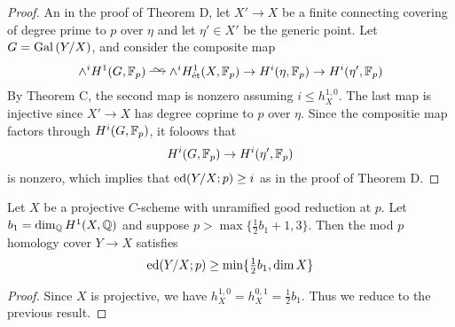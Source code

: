 \documentclass[12pt]{article}
\begin{document}
\begin{proof}
An in the proof of Theorem D, let $X' \to X$ be a finite connecting covering of degree prime to $p$ over $\eta$ and let $\eta' \in X'$ be the generic point. Let $G = \mathrm{Gal}\left( Y/X \right)$, and consider the composite map
\[ \wedge^i H^1(G, \FF_p) \iso \wedge^i H^1_{\et}(X, \FF_p) \to H^i(\eta, \FF_p) \to H^i(\eta', \FF_p) \]
By Theorem C, the second map is nonzero assuming $i \le h^{1,0}_X$. The last map is injective since $X' \to X$ has degree coprime to $p$ over $\eta$. Since the compositie map factors through $H^i(G, \mathbb{F}_p)$, it foloows that
\[ H^i(G, \mathbb{F}_p) \to H^i(\eta', \mathbb{F}_p) \]
is nonzero, which implies that $\mathrm{ed}(Y/X ; p) \ge i$ as in the proof of Theorem D. 
\end{proof}

\begin{cor}
Let $X$ be a projective $C$-scheme with unramified good reduction at $p$. Let $b_1 = \dim_{\mathbb{Q}} H^1(X, \mathbb{Q})$ and suppose $p > \max\{ \tfrac{1}{2} b_1 + 1, 3 \}$. Then the mod $p$ homology cover $Y \to X$ satisfies
\[ \mathrm{ed}(Y/X ; p) \ge \min \{ \tfrac{1}{2} b_1, \dim{X} \} \]
\end{cor}

\begin{proof}
Since $X$ is projective, we have $h^{1,0}_X = h^{0,1}_X = \tfrac{1}{2} b_1$. Thus we reduce to the previous result.
\end{proof}
\end{document}
